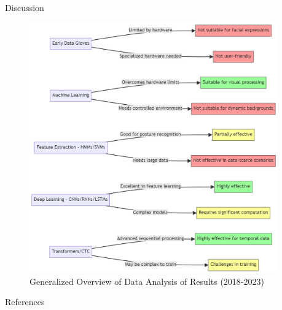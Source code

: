 \documentclass[xcolor={cmyk}]{beamer} %
\begin{document}
\begin{frame}[t]
\begin{columns}[t]
\begin{column}{0.3\textwidth}
			\begin{block}{Discussion}
				\begin{figure}
					\includegraphics[width=0.95\linewidth]{mermaid-diagram-discussion.png}
					\caption{Generalized Overview of Data Analysis of Results (2018-2023)}
				\end{figure}
			\end{block}


			\begin{block}{References}
				\fontsize{6}{10}\selectfont
				\vspace{-1ex} %
				
				
			\end{block}


		\end{column}

		\begin{column}{0.005\textwidth}\end{column} %


\end{columns}
\end{frame}
\end{document}
